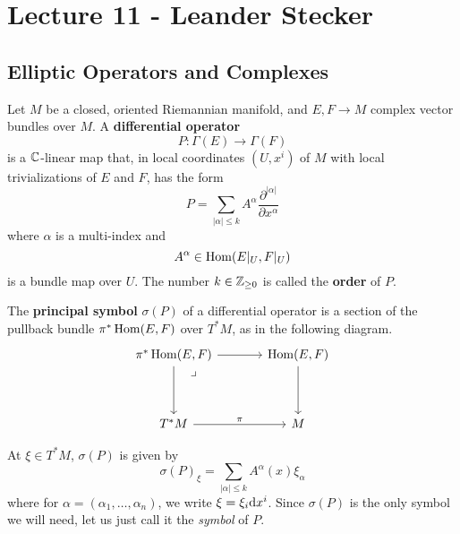 \chapter{Lecture 11 - Leander Stecker}

\section{Elliptic Operators and Complexes}

Let $M$ be a closed, oriented Riemannian manifold, and $E, F \to M$ complex vector bundles over $M$.
A \textbf{differential operator}
\begin{equation*}
  P \colon \Gamma (E) \longrightarrow \Gamma(F)
\end{equation*}
is a $\mathbb{C}$-linear map that, in local coordinates $(U, x^i)$ of $M$ with local trivializations of $E$ and $F$, has the form
\begin{equation*}
  P = \sum_{|\alpha| \leq k} A^\alpha
  \frac{\partial^{|\alpha|} }{\partial x^{\alpha}}
\end{equation*}
where $\alpha$ is a multi-index and
\begin{equation*}
  A^\alpha \in \operatorname{Hom} ( E |_U, F |_U )
\end{equation*}
is a bundle map over $U$.
The number $k \in \mathbb{Z}_{\geq 0}$ is called the \textbf{order} of $P$.

\begin{definition}
  The \textbf{principal symbol} $\sigma(P)$ of a differential operator is a section of the pullback bundle
  $\pi^* \operatorname{Hom}(E, F)$ over $T^*M$, as in the following diagram.
  \begin{equation*}
    \begin{tikzcd}[sep=large]
      |[label={-45:\lrcorner}]|
      \pi^* \Hom(E, F) \arrow[r] \arrow[d] &
      \Hom(E, F) \arrow[d] \\
      T^* M \arrow[r, "\pi"] &
      M
    \end{tikzcd}
  \end{equation*}
\end{definition}

At $\xi \in T^* M$, $\sigma(P)$ is given by
\begin{equation*}
  \sigma(P)_\xi = \sum_{|\alpha| \leq k} A^\alpha (x) \xi_\alpha
\end{equation*}
where for $\alpha = (\alpha_1, \dots, \alpha_n)$, we write $\xi = \xi_i \mathrm{d} x^i$.
Since $\sigma(P)$ is the only symbol we will need, let us just call it the \textit{symbol} of $P$.

